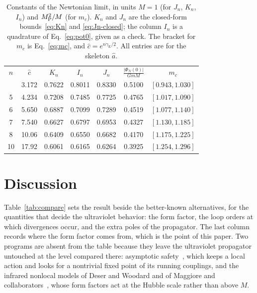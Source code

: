 \documentclass[aps,prd,10pt,twocolumn,superscriptaddress,nofootinbib,floatfix,longbibliography]{revtex4-2}
\newcommand{\gE}{\gamma_{\mathrm E}}
\begin{document}
\begin{table}[t]
\caption{Constants of the Newtonian limit, in units $M=1$ (for $J_n$, $K_n$, $I_n$) and $M_{\rm P}^2/M$ (for $m_c$). $K_n$ and $J_n$ are the closed-form bounds~\eqref{eq:Kn} and \eqref{eq:Jn-closed}; the column $I_n$ is a quadrature of Eq.~\eqref{eq:pot0}, given as a check. The bracket for $m_c$ is Eq.~\eqref{eq:mc}, and $\hat c=e^{n\gE/2}$. All entries are for the skeleton $\hat a$.}
\label{tab:newton}
\begin{ruledtabular}
\setlength{\tabcolsep}{3.2pt}
\begin{tabular}{ccccccc}
$n$ & $\hat c$ & $K_n$ & $I_n$ & $J_n$ & $\frac{|\Phi_N(0)|}{GmM}$ & $m_c$\\
\colrule
4 & 3.172 & 0.7622 & 0.8011 & 0.8330 & 0.5100 & $[0.943,1.030]$\\
5 & 4.234 & 0.7208 & 0.7485 & 0.7725 & 0.4765 & $[1.017,1.090]$\\
6 & 5.650 & 0.6887 & 0.7099 & 0.7289 & 0.4519 & $[1.077,1.140]$\\
7 & 7.540 & 0.6627 & 0.6797 & 0.6953 & 0.4327 & $[1.130,1.185]$\\
8 & 10.06 & 0.6409 & 0.6550 & 0.6682 & 0.4170 & $[1.175,1.225]$\\
10 & 17.92 & 0.6061 & 0.6165 & 0.6264 & 0.3925 & $[1.254,1.296]$\\
\end{tabular}
\end{ruledtabular}
\end{table}

\section{Discussion}
\label{sec:discussion}

Table~\ref{tab:compare} sets the result beside the better-known alternatives, for the quantities that decide the ultraviolet behavior: the form factor, the loop orders at which divergences occur, and the extra poles of the propagator. The last column records where the form factor comes from, which is the point of this paper. Two programs are absent from the table because they leave the ultraviolet propagator untouched at the level compared there: asymptotic safety~\cite{Reuter1998}, which keeps a local action and looks for a nontrivial fixed point of its running couplings, and the infrared nonlocal models of Deser and Woodard and of Maggiore and collaborators~\cite{DeserWoodard2007,MaggioreMancarella2014,Belgacem2018}, whose form factors act at the Hubble scale rather than above $M$.
\end{document}
